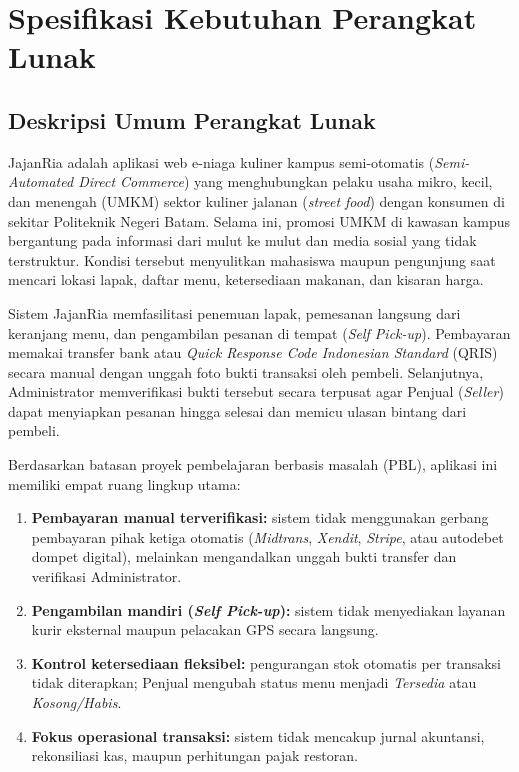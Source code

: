 \section{Spesifikasi Kebutuhan Perangkat Lunak}

\subsection{Deskripsi Umum Perangkat Lunak}

JajanRia adalah aplikasi web e-niaga kuliner kampus semi-otomatis (\textit{Semi-Automated Direct Commerce}) yang menghubungkan pelaku usaha mikro, kecil, dan menengah (UMKM) sektor kuliner jalanan (\textit{street food}) dengan konsumen di sekitar Politeknik Negeri Batam. Selama ini, promosi UMKM di kawasan kampus bergantung pada informasi dari mulut ke mulut dan media sosial yang tidak terstruktur. Kondisi tersebut menyulitkan mahasiswa maupun pengunjung saat mencari lokasi lapak, daftar menu, ketersediaan makanan, dan kisaran harga.

Sistem JajanRia memfasilitasi penemuan lapak, pemesanan langsung dari keranjang menu, dan pengambilan pesanan di tempat (\textit{Self Pick-up}). Pembayaran memakai transfer bank atau \textit{Quick Response Code Indonesian Standard} (QRIS) secara manual dengan unggah foto bukti transaksi oleh pembeli. Selanjutnya, Administrator memverifikasi bukti tersebut secara terpusat agar Penjual (\textit{Seller}) dapat menyiapkan pesanan hingga selesai dan memicu ulasan bintang dari pembeli.

Berdasarkan batasan proyek pembelajaran berbasis masalah (PBL), aplikasi ini memiliki empat ruang lingkup utama:
\begin{enumerate}[leftmargin=1.5em, itemsep=2pt, topsep=2pt]
  \item \textbf{Pembayaran manual terverifikasi:} sistem tidak menggunakan gerbang pembayaran pihak ketiga otomatis (\textit{Midtrans}, \textit{Xendit}, \textit{Stripe}, atau autodebet dompet digital), melainkan mengandalkan unggah bukti transfer dan verifikasi Administrator.
  \item \textbf{Pengambilan mandiri (\textit{Self Pick-up}):} sistem tidak menyediakan layanan kurir eksternal maupun pelacakan GPS secara langsung.
  \item \textbf{Kontrol ketersediaan fleksibel:} pengurangan stok otomatis per transaksi tidak diterapkan; Penjual mengubah status menu menjadi \textit{Tersedia} atau \textit{Kosong/Habis}.
  \item \textbf{Fokus operasional transaksi:} sistem tidak mencakup jurnal akuntansi, rekonsiliasi kas, maupun perhitungan pajak restoran.
\end{enumerate}

